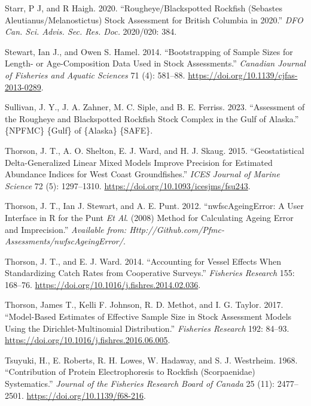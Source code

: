 \documentclass[
]{scrartcl}
\newlength{\cslhangindent}
\newenvironment{CSLReferences}[2] %
 {\begin{list}{}{%
  \setlength{\itemindent}{0pt}
  \setlength{\leftmargin}{0pt}
  \setlength{\parsep}{0pt}
  \ifodd #1
   \setlength{\leftmargin}{\cslhangindent}
   \setlength{\itemindent}{-1\cslhangindent}
  \fi
  \setlength{\itemsep}{#2\baselineskip}}}
 {\end{list}}
\begin{document}
\begin{CSLReferences}{1}{0}
Starr, P J, and R Haigh. 2020. {``Rougheye/{Blackspotted} {Rockfish}
({Sebastes} Aleutianus/Melanostictus) Stock Assessment for {British}
{Columbia} in 2020.''} \emph{DFO Can. Sci. Advis. Sec. Res. Doc.}
2020/020: 384.

Stewart, Ian J., and Owen S. Hamel. 2014. {``Bootstrapping of Sample
Sizes for Length- or Age-Composition Data Used in Stock Assessments.''}
\emph{Canadian Journal of Fisheries and Aquatic Sciences} 71 (4):
581--88. \url{https://doi.org/10.1139/cjfas-2013-0289}.

Sullivan, J. Y., J. A. Zahner, M. C. Siple, and B. E. Ferriss. 2023.
{``Assessment of the {Rougheye} and {Blackspotted} {Rockfish} Stock
Complex in the {Gulf} of {Alaska}.''} \{NPFMC\} \{Gulf\} of \{Alaska\}
\{SAFE\}.

Thorson, J. T., A. O. Shelton, E. J. Ward, and H. J. Skaug. 2015.
{``Geostatistical Delta-Generalized Linear Mixed Models Improve
Precision for Estimated Abundance Indices for {West} {Coast}
Groundfishes.''} \emph{ICES Journal of Marine Science} 72 (5):
1297--1310. \url{https://doi.org/10.1093/icesjms/fsu243}.

Thorson, J. T., Ian J. Stewart, and A. E. Punt. 2012.
{``{nwfscAgeingError}: A User Interface in {R} for the {P}unt \emph{Et
Al}. (2008) Method for Calculating Ageing Error and Imprecision.''}
\emph{Available from:
Http://Github.com/Pfmc-Assessments/nwfscAgeingError/}.

Thorson, J. T., and E. J. Ward. 2014. {``Accounting for Vessel Effects
When Standardizing Catch Rates from Cooperative Surveys.''}
\emph{Fisheries Research} 155: 168--76.
\url{https://doi.org/10.1016/j.fishres.2014.02.036}.

Thorson, James T., Kelli F. Johnson, R. D. Methot, and I. G. Taylor.
2017. {``Model-Based Estimates of Effective Sample Size in Stock
Assessment Models Using the {Dirichlet}-Multinomial Distribution.''}
\emph{Fisheries Research} 192: 84--93.
\url{https://doi.org/10.1016/j.fishres.2016.06.005}.

Tsuyuki, H., E. Roberts, R. H. Lowes, W. Hadaway, and S. J. Westrheim.
1968. {``Contribution of {Protein} {Electrophoresis} to {Rockfish}
({Scorpaenidae}) {Systematics}.''} \emph{Journal of the Fisheries
Research Board of Canada} 25 (11): 2477--2501.
\url{https://doi.org/10.1139/f68-216}.


\end{CSLReferences}
\end{document}
